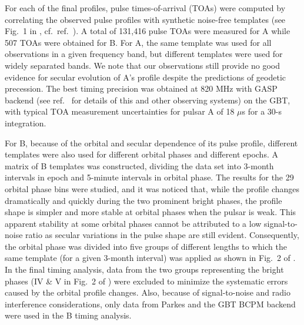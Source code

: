 \documentclass[12pt,psfig]{article}
\begin{document}
For each of the final profiles, pulse times-of-arrival (TOAs) were computed by
correlating the observed pulse profiles with synthetic noise-free templates
(see Fig.~1 in \cite{som},
 cf.~ref.~\cite{kll+99}). A total of 131,416 pulse TOAs were
measured for A while 507 TOAs were obtained for B. For A, the same template
was used for all observations in a given frequency band, but different
templates were used for widely separated bands.  We note that our observations
still provide no good evidence for secular evolution of A's
profile\cite{mkp+05} despite the predictions of geodetic precession.  The best
timing precision was obtained at 820 MHz with GASP backend (see 
ref.~\cite{som} for details of this and other observing systems) on the
GBT, with typical TOA measurement uncertainties for pulsar A of 18 $\mu$s for
a 30-s integration.

For B, because of the orbital and secular dependence of its pulse
profile\cite{bpm+05}, different templates were also used for different orbital
phases and different epochs. A matrix of B templates was constructed, dividing
the data set into 3-month intervals in epoch and 5-minute intervals in orbital
phase. The results for the 29 orbital phase bins were studied, and it was
noticed that, while the profile changes dramatically and quickly during the
two prominent bright phases, the profile shape is simpler and more stable at
orbital phases when the pulsar is weak. This apparent stability at some
orbital phases cannot be attributed to a low signal-to-noise ratio as secular
variations in the pulse shape are still evident.  Consequently, the orbital
phase was divided into five groups of different lengths to which the
same template (for a given 3-month interval) was applied as shown in Fig.~2
of \cite{som}.
In the final timing analysis, data from the two groups representing the bright
phases (IV \& V in Fig.~2 of \cite{som}) 
were excluded to minimize the systematic errors
caused by the orbital profile changes. Also, because of signal-to-noise and
radio interference considerations, only data from Parkes and the GBT BCPM
backend were used in the B timing analysis.
\end{document}
